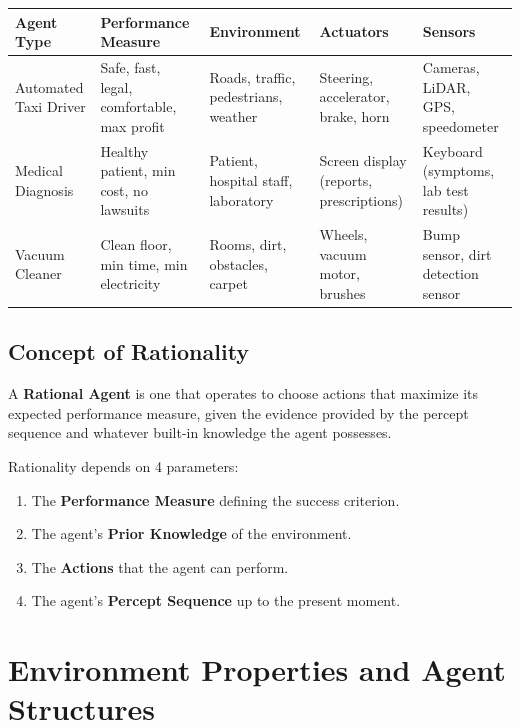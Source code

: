 \documentclass[12pt,a4paper]{article}
\renewcommand{\arraystretch}{1.45}
\begin{document}
\par\vspace{6pt}\noindent
{\renewcommand{\arraystretch}{1.4}%
\begin{tabularx}{\linewidth}{|B{2.8cm}|Y|Y|Y|Y|}
\hline
\textbf{Agent Type} & \textbf{Performance Measure} & \textbf{Environment} & \textbf{Actuators} & \textbf{Sensors} \\
\hline
Automated Taxi Driver & Safe, fast, legal, comfortable, max profit & Roads, traffic, pedestrians, weather & Steering, accelerator, brake, horn & Cameras, LiDAR, GPS, speedometer \\
\hline
Medical Diagnosis & Healthy patient, min cost, no lawsuits & Patient, hospital staff, laboratory & Screen display (reports, prescriptions) & Keyboard (symptoms, lab test results) \\
\hline
Vacuum Cleaner & Clean floor, min time, min electricity & Rooms, dirt, obstacles, carpet & Wheels, vacuum motor, brushes & Bump sensor, dirt detection sensor \\
\hline
\end{tabularx}}

\subsection{Concept of Rationality}
A \textbf{Rational Agent} is one that operates to choose actions that maximize its expected performance measure, given the evidence provided by the percept sequence and whatever built-in knowledge the agent possesses.

\begin{tcolorbox}[examplebox, title={Factors Determining Rationality}]
  Rationality depends on 4 parameters:
  \begin{enumerate}[leftmargin=*, noitemsep]
    \item The \textbf{Performance Measure} defining the success criterion.
    \item The agent's \textbf{Prior Knowledge} of the environment.
    \item The \textbf{Actions} that the agent can perform.
    \item The agent's \textbf{Percept Sequence} up to the present moment.
  \end{enumerate}
\end{tcolorbox}

\section{Environment Properties and Agent Structures}
\end{document}

